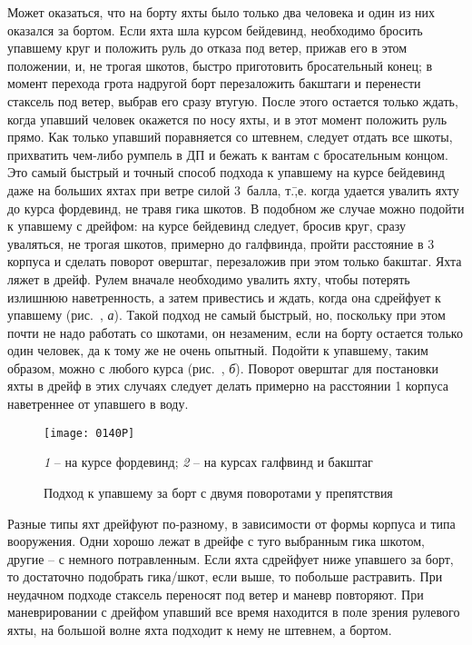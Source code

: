 Может оказаться, что на борту яхты было только два человека и один из них оказался за бортом. Если яхта шла курсом бейдевинд, необходимо бросить упавшему круг и положить руль до отказа под ветер, прижав его в этом положении, и, не трогая шкотов, быстро приготовить бросательный конец; в момент перехода грота надругой борт перезаложить бакштаги и перенести стаксель под ветер, выбрав его сразу втугую. После этого остается только ждать, когда упавший человек окажется по носу яхты, и в этот момент положить руль прямо. Как только упавший поравняется со штевнем, следует отдать все шкоты, прихватить чем-либо румпель в ДП и бежать к вантам с бросательным концом. Это самый быстрый и точный способ подхода к упавшему на курсе бейдевинд даже на больших яхтах при ветре силой 3~балла, т.\=,е. когда удается увалить яхту до курса фордевинд, не травя гика шкотов. В подобном же случае можно подойти к упавшему с дрейфом: на курсе бейдевинд следует, бросив круг, сразу уваляться, не трогая шкотов, примерно до галфвинда, пройти расстояние в 3 корпуса и сделать поворот оверштаг, перезаложив при этом только бакштаг. Яхта ляжет в дрейф. Рулем вначале необходимо увалить яхту, чтобы потерять излишнюю наветренность, а затем привестись и ждать, когда она сдрейфует к упавшему (рис.~, \textit{а}). Такой подход не самый быстрый, но, поскольку при этом почти не надо работать со шкотами, он незаменим, если на борту остается только один человек, да к тому же не очень опытный. Подойти к упавшему, таким образом, можно с любого курса (рис.~, \textit{б}). Поворот оверштаг для постановки яхты в дрейф в этих случаях следует делать примерно на расстоянии 1 корпуса наветреннее от упавшего в воду. 

\begin{figure}[htb]
  \centering{}
  \texttt{[image: 0140P]}
  \caption{Подход к упавшему за борт с двумя поворотами у препятствия}
  \label{fig:140}
  \small
  \centering{}
  \textit{1} \--- на курсе фордевинд; \textit{2} \--- на курсах галфвинд и бакштаг
\end{figure}

Разные типы яхт дрейфуют по-разному, в зависимости от формы корпуса и типа вооружения. Одни хорошо лежат в дрейфе с туго выбранным гика шкотом, другие \--- с немного потравленным. Если яхта сдрейфует ниже упавшего за борт, то достаточно подобрать гика\-/шкот, если выше, то побольше растравить. При неудачном подходе стаксель переносят под ветер и маневр повторяют. При маневрировании с дрейфом упавший все время находится в поле зрения рулевого яхты, на большой волне яхта подходит к нему не штевнем, а бортом.

